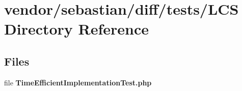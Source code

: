 \section{vendor/sebastian/diff/tests/\+L\+C\+S Directory Reference}
\label{dir_76388adf765c15a71ff22dbfdedc8cc1}
\subsection*{Files}
\begin{DoxyCompactItemize}
\item 
file {\bf Time\+Efficient\+Implementation\+Test.\+php}
\end{DoxyCompactItemize}
